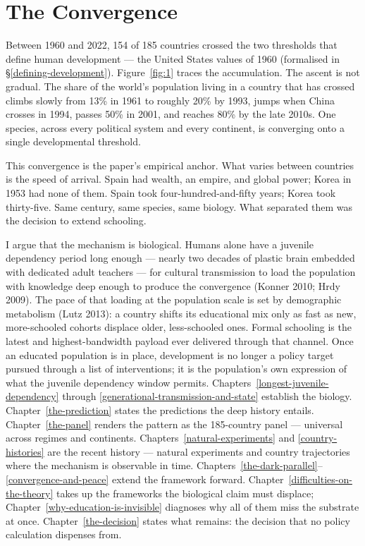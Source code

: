 \documentclass[12pt,letterpaper]{article}
\begin{document}
\newpage

\section{The Convergence}\label{the-convergence}

Between 1960 and 2022, 154 of 185 countries crossed the two thresholds
that define human development --- the United States values of 1960
(formalised in \S\ref{defining-development}). Figure~\ref{fig:1}
traces the accumulation. The ascent
is not gradual. The share of the world's population living in a
country that has crossed climbs slowly from 13\% in 1961 to roughly
20\% by 1993, jumps when China crosses in 1994, passes 50\% in 2001,
and reaches 80\% by the late 2010s. One species, across every
political system and every continent, is converging onto a single
developmental threshold.

This convergence is the paper's empirical anchor. What varies between
countries is the speed of arrival. Spain had wealth, an empire, and
global power; Korea in 1953 had none of them. Spain took
four-hundred-and-fifty years; Korea took thirty-five. Same century,
same species, same biology. What separated them was the decision to
extend schooling.

I argue that the mechanism is biological. Humans alone have
a juvenile dependency period long enough --- nearly two decades of
plastic brain embedded with dedicated adult teachers --- for cultural
transmission to load the population with knowledge deep enough to
produce the convergence (Konner 2010; Hrdy 2009). The pace of that
loading at the population scale is set by demographic metabolism
(Lutz 2013): a country shifts its educational mix only as fast as
new, more-schooled cohorts displace older, less-schooled ones.
Formal schooling is the latest and highest-bandwidth payload ever
delivered through that channel. Once an educated population is in
place, development is no longer a policy target pursued through a
list of interventions; it is the population's own expression of
what the juvenile dependency window permits. Chapters~\ref{longest-juvenile-dependency} through
\ref{generational-transmission-and-state} establish the biology.
Chapter~\ref{the-prediction} states the predictions the deep history
entails. Chapter~\ref{the-panel} renders the pattern as the
185-country panel --- universal across regimes and continents.
Chapters~\ref{natural-experiments} and \ref{country-histories} are the
recent history --- natural experiments and country trajectories where
the mechanism is observable in time.
Chapters~\ref{the-dark-parallel}--\ref{convergence-and-peace} extend
the framework forward.
Chapter~\ref{difficulties-on-the-theory} takes up the frameworks the
biological claim must displace;
Chapter~\ref{why-education-is-invisible} diagnoses why all of them
miss the substrate at once. Chapter~\ref{the-decision} states what
remains: the decision that no policy calculation dispenses from.
\end{document}
